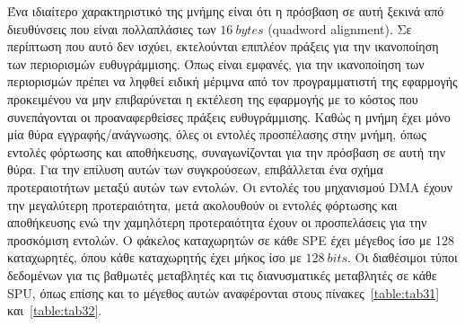 Ένα ιδιαίτερο χαρακτηριστικό της μνήμης είναι ότι η πρόσβαση σε αυτή ξεκινά από διευθύνσεις που είναι πολλαπλάσιες των \(16\ bytes\) (quadword alignment). Σε περίπτωση που αυτό δεν ισχύει, εκτελούνται επιπλέον πράξεις για την ικανοποίηση των περιορισμών ευθυγράμμισης. Όπως είναι εμφανές, για την ικανοποίηση των περιορισμών πρέπει να ληφθεί ειδική μέριμνα από τον προγραμματιστή της εφαρμογής προκειμένου να μην επιβαρύνεται η εκτέλεση της εφαρμογής με το κόστος που συνεπάγονται οι προαναφερθείσες πράξεις ευθυγράμμισης. \newline \indent
Καθώς η μνήμη έχει μόνο μία θύρα εγγραφής/ανάγνωσης, όλες οι εντολές προσπέλασης στην μνήμη, όπως εντολές φόρτωσης και αποθήκευσης, συναγωνίζονται για την πρόσβαση σε αυτή την θύρα. Για την επίλυση αυτών των συγκρούσεων, επιβάλλεται ένα σχήμα προτεραιοτήτων μεταξύ αυτών των εντολών. Οι εντολές του μηχανισμού \ac{DMA} έχουν την μεγαλύτερη προτεραιότητα, μετά ακολουθούν οι εντολές φόρτωσης και αποθήκευσης ενώ την χαμηλότερη προτεραιότητα έχουν οι προσπελάσεις για την προσκόμιση εντολών.\newline \indent
Ο φάκελος καταχωρητών σε κάθε \ac{SPE} έχει μέγεθος ίσο με 128 καταχωρητές, όπου κάθε καταχωρητής έχει μήκος ίσο με \(128\ bits\). Οι διαθέσιμοι τύποι δεδομένων για τις βαθμωτές μεταβλητές και τις διανυσματικές μεταβλητές σε κάθε \ac{SPU}, όπως επίσης και το μέγεθος αυτών αναφέρονται στους πίνακες~\ref{table:tab31} και~\ref{table:tab32}.
